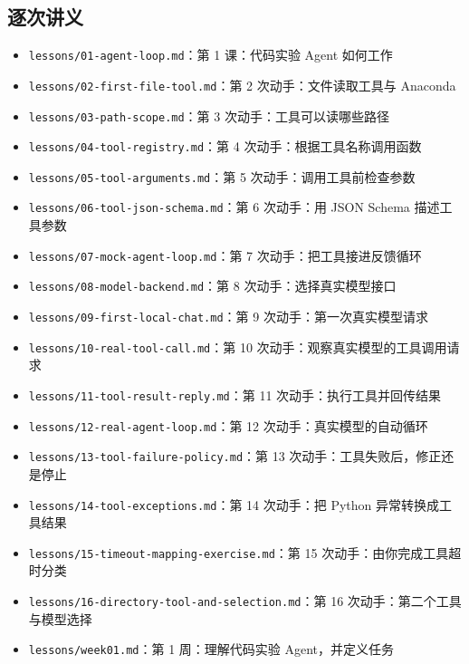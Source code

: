 \subsection{逐次讲义}
\begin{itemize}
\item \nolinkurl{lessons/01-agent-loop.md}：第 1 课：代码实验 Agent 如何工作
\item \nolinkurl{lessons/02-first-file-tool.md}：第 2 次动手：文件读取工具与 Anaconda
\item \nolinkurl{lessons/03-path-scope.md}：第 3 次动手：工具可以读哪些路径
\item \nolinkurl{lessons/04-tool-registry.md}：第 4 次动手：根据工具名称调用函数
\item \nolinkurl{lessons/05-tool-arguments.md}：第 5 次动手：调用工具前检查参数
\item \nolinkurl{lessons/06-tool-json-schema.md}：第 6 次动手：用 JSON Schema 描述工具参数
\item \nolinkurl{lessons/07-mock-agent-loop.md}：第 7 次动手：把工具接进反馈循环
\item \nolinkurl{lessons/08-model-backend.md}：第 8 次动手：选择真实模型接口
\item \nolinkurl{lessons/09-first-local-chat.md}：第 9 次动手：第一次真实模型请求
\item \nolinkurl{lessons/10-real-tool-call.md}：第 10 次动手：观察真实模型的工具调用请求
\item \nolinkurl{lessons/11-tool-result-reply.md}：第 11 次动手：执行工具并回传结果
\item \nolinkurl{lessons/12-real-agent-loop.md}：第 12 次动手：真实模型的自动循环
\item \nolinkurl{lessons/13-tool-failure-policy.md}：第 13 次动手：工具失败后，修正还是停止
\item \nolinkurl{lessons/14-tool-exceptions.md}：第 14 次动手：把 Python 异常转换成工具结果
\item \nolinkurl{lessons/15-timeout-mapping-exercise.md}：第 15 次动手：由你完成工具超时分类
\item \nolinkurl{lessons/16-directory-tool-and-selection.md}：第 16 次动手：第二个工具与模型选择
\item \nolinkurl{lessons/week01.md}：第 1 周：理解代码实验 Agent，并定义任务
\end{itemize}

